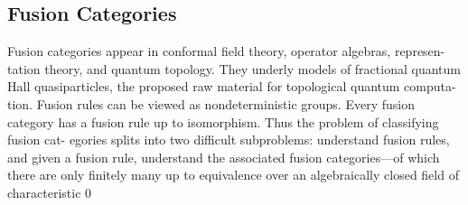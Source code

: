 \documentclass[preprint, 5p, 10pt]{elsarticle}
\theoremstyle{plain}
\begin{document}
\subsection{Fusion Categories}%
Fusion categories appear in conformal field theory, operator algebras, represen-
tation theory, and quantum topology. They underly models of fractional quantum
Hall quasiparticles, the proposed raw material for topological quantum computa-
tion. Fusion rules can be viewed as nondeterministic groups. Every fusion category
has a fusion rule up to isomorphism. Thus the problem of classifying fusion cat-
egories splits into two difficult subproblems: understand fusion rules, and given a
fusion rule, understand the associated fusion categories—of which there are only
finitely many up to equivalence over an algebraically closed field of characteristic 0
\end{document}
